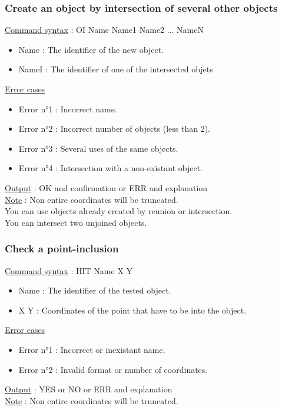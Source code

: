 \documentclass[a4paper, 12pts]{article}
\begin{document}
		\subsubsection{Create an object by intersection of several other objects}
			\uline{Command syntax} :
			OI Name Name1 Name2 ... NameN
			\begin{itemize}
				\item Name : The identifier of the new object.
				\item NameI : The identifier of one of the intersected objets
			\end{itemize}
			\uline{Error cases}
			\begin{itemize}
				\item Error n°1 : Incorrect name.
				\item Error n°2 : Incorrect number of objects (less than 2).
				\item Error n°3 : Several uses of the same objects.
				\item Error n°4 : Intersection with a non-existant object.
			\end{itemize}
			\uline{Output} : OK and confirmation or ERR and explanation\\
			\uline{Note} : 
			Non entire coordinates will be truncated.\\
			You can use objects already created by reunion or intersection.\\
			You can intersect two unjoined objects.

		\subsubsection{Check a point-inclusion}
			\uline{Command syntax} :
			HIT Name X Y
			\begin{itemize}
				\item Name : The identifier of the tested object.
				\item X Y : Coordinates of the point that have to be into the object.
			\end{itemize}
			\uline{Error cases}
			\begin{itemize}
				\item Error n°1 : Incorrect or inexistant name.
				\item Error n°2 : Invalid format or number of coordinates.
			\end{itemize}
			\uline{Output} : YES or NO or ERR and explanation\\
			\uline{Note} : 
			Non entire coordinates will be truncated.
\end{document}
